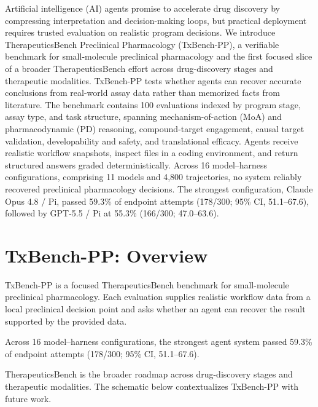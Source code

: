 \documentclass[10pt,letterpaper]{article}
\begin{document}
\PreprintHeader

\begin{PreprintAbstract}
Artificial intelligence (AI) agents promise to accelerate drug discovery by
compressing interpretation and decision-making loops, but practical deployment
requires trusted evaluation on realistic program decisions. We introduce
TherapeuticsBench Preclinical Pharmacology (TxBench-PP), a verifiable benchmark
for small-molecule
preclinical pharmacology and the first focused slice of a broader
TherapeuticsBench effort across drug-discovery stages and therapeutic
modalities. TxBench-PP tests whether agents can recover accurate conclusions
from real-world assay data rather than memorized facts from literature. The
benchmark contains 100 evaluations indexed by program stage, assay type, and
task structure, spanning mechanism-of-action (MoA) and pharmacodynamic (PD)
reasoning, compound-target engagement, causal target validation,
developability and safety, and translational efficacy. Agents receive realistic
workflow snapshots, inspect files in a coding environment, and return
structured answers graded deterministically. Across 16 model--harness
configurations, comprising 11 models and 4,800 trajectories, no system reliably
recovered preclinical
pharmacology decisions. The strongest configuration, Claude Opus 4.8 / Pi,
passed 59.3\% of endpoint attempts (178/300; 95\% CI, 51.1--67.6), followed by
GPT-5.5 / Pi at 55.3\% (166/300; 47.0--63.6).
\end{PreprintAbstract}

\vfill
\clearpage

\section*{TxBench-PP: Overview}

{\fontsize{9.1}{12.8}\selectfont
TxBench-PP is a focused TherapeuticsBench benchmark for small-molecule
preclinical pharmacology. Each evaluation supplies realistic workflow data
from a local preclinical decision point and asks whether an agent can recover
the result supported by the provided data.

Across 16 model--harness configurations, the strongest agent system passed
59.3\% of endpoint attempts (178/300; 95\% CI, 51.1--67.6).

TherapeuticsBench is the broader roadmap across drug-discovery stages and
therapeutic modalities. The schematic below contextualizes TxBench-PP with
future work.
\par}
\end{document}
